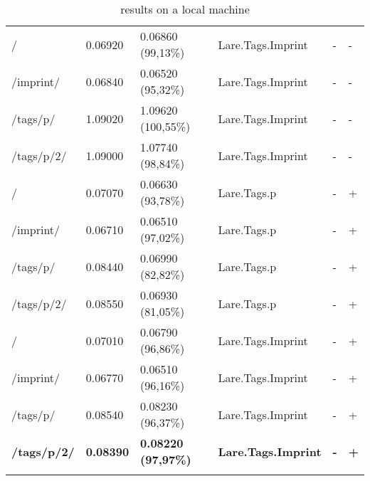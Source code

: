 \begin{center}
\begin{longtable}{llllll}
    \hline
	/ & 0.06920 & 0.06860 (99,13\%) & Lare.Tags.Imprint & - & - \\
	/imprint/ & 0.06840 & 0.06520 (95,32\%) & Lare.Tags.Imprint & - & - \\
	/tags/p/ & 1.09020 & 1.09620 (100,55\%) & Lare.Tags.Imprint & - & - \\
	/tags/p/2/ & 1.09000 & 1.07740 (98,84\%) & Lare.Tags.Imprint & - & - \\
	\hline
	\hline
	/ & 0.07070 & 0.06630 (93,78\%) & Lare.Tags.p & - & + \\
	/imprint/ & 0.06710 & 0.06510 (97,02\%) & Lare.Tags.p & - & + \\
	/tags/p/ & 0.08440 & 0.06990 (82,82\%) & Lare.Tags.p & - & + \\
	/tags/p/2/ & 0.08550 & 0.06930 (81,05\%) & Lare.Tags.p & - & + \\
	\hline
	/ & 0.07010 & 0.06790 (96,86\%) & Lare.Tags.Imprint & - & + \\
	/imprint/ & 0.06770 & 0.06510 (96,16\%) & Lare.Tags.Imprint & - & + \\
	/tags/p/ & 0.08540 & 0.08230 (96,37\%) & Lare.Tags.Imprint & - & + \\
	\textbf{/tags/p/2/} & \textbf{0.08390} & \textbf{0.08220 (97,97\%)} & \textbf{Lare.Tags.Imprint} & \textbf{-} & \textbf{+} \\
	\hline
\caption{\curl{} results on a local machine}
\label{tab:curl_results_local}
\end{longtable}
\end{center}



